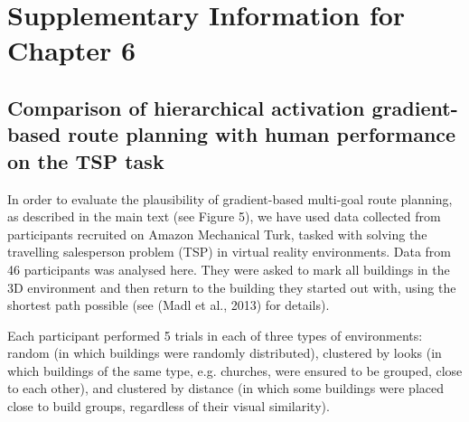 %
%


\chapter{Supplementary Information for Chapter 6}
\label{apx:lidaspm}
\section{Comparison of hierarchical activation gradient-based route planning with human performance on the TSP task}


In order to evaluate the plausibility of gradient-based multi-goal route planning, as described in the main text (see Figure 5), we have used data collected from participants recruited on Amazon Mechanical Turk, tasked with solving the travelling salesperson problem (TSP) in virtual reality environments. Data from 46 participants was analysed here. They were asked to mark all buildings in the 3D environment and then return to the building they started out with, using the shortest path possible (see (Madl et al., 2013) for details). 

Each participant performed 5 trials in each of three types of environments: random (in which buildings were randomly distributed), clustered by looks (in which buildings of the same type, e.g. churches, were ensured to be grouped, close to each other), and clustered by distance (in which some buildings were placed close to build groups, regardless of their visual similarity).

